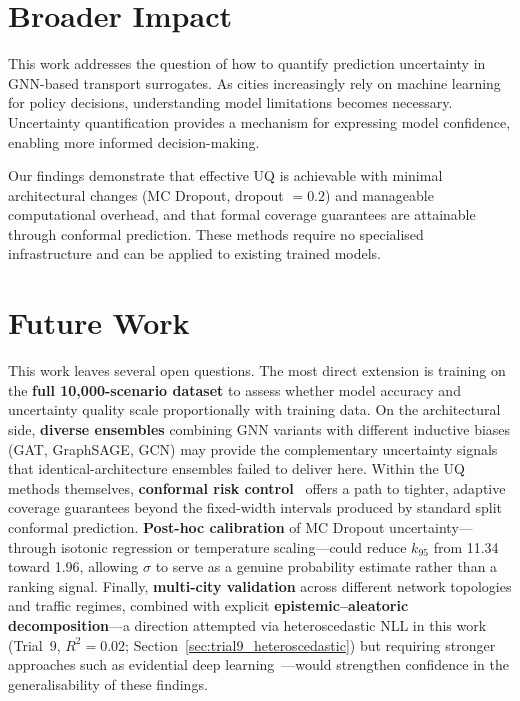 \section{Broader Impact}

This work addresses the question of how to quantify prediction uncertainty in GNN-based transport surrogates. As cities increasingly rely on machine learning for policy decisions, understanding model limitations becomes necessary. Uncertainty quantification provides a mechanism for expressing model confidence, enabling more informed decision-making.

Our findings demonstrate that effective UQ is achievable with minimal architectural changes (MC Dropout, dropout $= 0.2$) and manageable computational overhead, and that formal coverage guarantees are attainable through conformal prediction. These methods require no specialised infrastructure and can be applied to existing trained models.

\section{Future Work}

This work leaves several open questions. The most direct extension is training on the \textbf{full 10,000-scenario dataset} to assess whether model accuracy and uncertainty quality scale proportionally with training data. On the architectural side, \textbf{diverse ensembles} combining GNN variants with different inductive biases (GAT, GraphSAGE, GCN) may provide the complementary uncertainty signals that identical-architecture ensembles failed to deliver here. Within the UQ methods themselves, \textbf{conformal risk control}~\cite{angelopoulos2023conformal} offers a path to tighter, adaptive coverage guarantees beyond the fixed-width intervals produced by standard split conformal prediction. \textbf{Post-hoc calibration} of MC Dropout uncertainty---through isotonic regression or temperature scaling---could reduce $k_{95}$ from 11.34 toward 1.96, allowing $\sigma$ to serve as a genuine probability estimate rather than a ranking signal. Finally, \textbf{multi-city validation} across different network topologies and traffic regimes, combined with explicit \textbf{epistemic--aleatoric decomposition}---a direction attempted via heteroscedastic NLL in this work (Trial~9, $R^2 = 0.02$; Section~\ref{sec:trial9_heteroscedastic}) but requiring stronger approaches such as evidential deep learning~\cite{amini2020deep,seitzer2022pitfalls}---would strengthen confidence in the generalisability of these findings.

